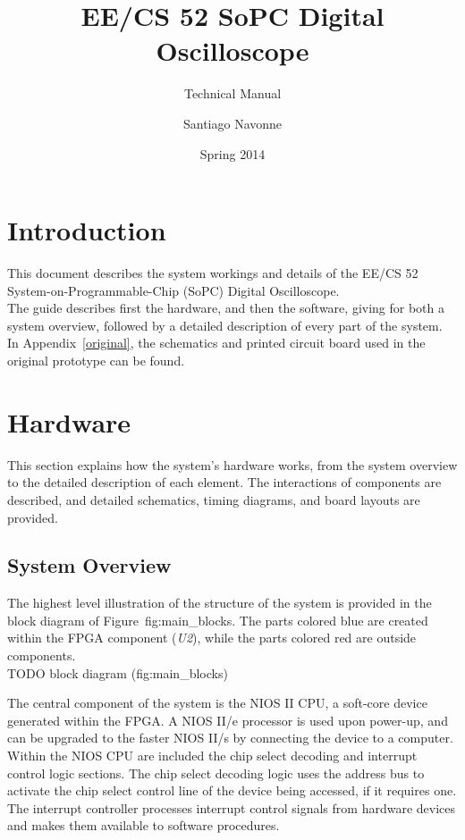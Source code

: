 \documentclass{scrartcl}
\begin{document}

	\title{EE/CS 52 SoPC Digital Oscilloscope}
	\subtitle{Technical Manual}
	\author{Santiago Navonne} 
	\date{Spring 2014} 
	\maketitle
	
	\section{Introduction}
	This document describes the system workings and details of the EE/CS 52 System-on-Programmable-Chip (SoPC) Digital Oscilloscope.\\

	The guide describes first the hardware, and then the software, giving for both a system overview, followed by a detailed description of every part of the system. In Appendix~\ref{original}, the schematics and printed circuit board used in the original prototype can be found.


	\section{Hardware}
	This section explains how the system's hardware works, from the system overview to the detailed description of each element. The interactions of components are described, and detailed schematics, timing diagrams, and board layouts are provided.
	
	\subsection{System Overview}
	The highest level illustration of the structure of the system is provided in the block diagram of Figure~{fig:main_blocks}. The parts colored blue are created within the FPGA component (\textit{U2}), while the parts colored red are outside components.\\

	TODO block diagram (fig:main_blocks)
	
	The central component of the system is the NIOS II CPU, a soft-core device generated within the FPGA. A NIOS II/e processor is used upon power-up, and can be upgraded to the faster NIOS II/s by connecting the device to a computer. Within the NIOS CPU are included the chip select decoding and interrupt control logic sections. The chip select decoding logic uses the address bus to activate the chip select control line of the device being accessed, if it requires one. The interrupt controller processes interrupt control signals from hardware devices and makes them available to software procedures.\\
\end{document}
